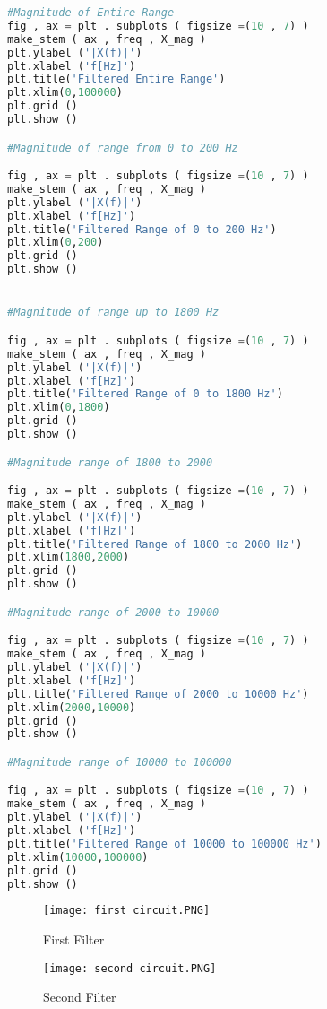 \documentclass[11pt,a4]{report}
\begin{document}
\begin{lstlisting}[language=Python]
#Magnitude of Entire Range
fig , ax = plt . subplots ( figsize =(10 , 7) )
make_stem ( ax , freq , X_mag )
plt.ylabel ('|X(f)|')
plt.xlabel ('f[Hz]')
plt.title('Filtered Entire Range')
plt.xlim(0,100000)
plt.grid ()
plt.show ()

#Magnitude of range from 0 to 200 Hz

fig , ax = plt . subplots ( figsize =(10 , 7) )
make_stem ( ax , freq , X_mag )
plt.ylabel ('|X(f)|')
plt.xlabel ('f[Hz]')
plt.title('Filtered Range of 0 to 200 Hz')
plt.xlim(0,200)
plt.grid ()
plt.show ()


#Magnitude of range up to 1800 Hz

fig , ax = plt . subplots ( figsize =(10 , 7) )
make_stem ( ax , freq , X_mag )
plt.ylabel ('|X(f)|')
plt.xlabel ('f[Hz]')
plt.title('Filtered Range of 0 to 1800 Hz')
plt.xlim(0,1800)
plt.grid ()
plt.show ()

#Magnitude range of 1800 to 2000

fig , ax = plt . subplots ( figsize =(10 , 7) )
make_stem ( ax , freq , X_mag )
plt.ylabel ('|X(f)|')
plt.xlabel ('f[Hz]')
plt.title('Filtered Range of 1800 to 2000 Hz')
plt.xlim(1800,2000)
plt.grid ()
plt.show ()

#Magnitude range of 2000 to 10000

fig , ax = plt . subplots ( figsize =(10 , 7) )
make_stem ( ax , freq , X_mag )
plt.ylabel ('|X(f)|')
plt.xlabel ('f[Hz]')
plt.title('Filtered Range of 2000 to 10000 Hz')
plt.xlim(2000,10000)
plt.grid ()
plt.show ()

#Magnitude range of 10000 to 100000

fig , ax = plt . subplots ( figsize =(10 , 7) )
make_stem ( ax , freq , X_mag )
plt.ylabel ('|X(f)|')
plt.xlabel ('f[Hz]')
plt.title('Filtered Range of 10000 to 100000 Hz')
plt.xlim(10000,100000)
plt.grid ()
plt.show ()
\end{lstlisting}

\begin{figure}[h!]
    \begin{center}
  \caption{First Filter}
  \texttt{[image: first circuit.PNG]}
\end{center}
\end{figure}

\begin{figure}[h!]
    \begin{center}
  \caption{Second Filter}
  \texttt{[image: second circuit.PNG]}
\end{center}
\end{figure}
\end{document}
